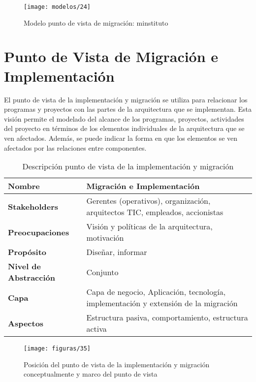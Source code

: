  \begin{figure}[H]
	\centering
	\texttt{[image: modelos/24]}
	\captionsetup{width=.95\textwidth}
	\caption{Modelo punto de vista de migración: minstituto}
	\label{modelo24}
  \end{figure}
  
\section{Punto de Vista de Migración e Implementación}
El punto de vista de la implementación y migración se utiliza para relacionar los programas y proyectos con las partes de la arquitectura que se implementan. Esta visión permite el modelado del alcance de los programas, proyectos, actividades del proyecto en términos de los elementos individuales de la arquitectura que se ven afectados. Además, se puede indicar la forma en que los elementos se ven afectados por las relaciones entre componentes.

  \begin{table}[H]
	\centering
	\begin{tabular}{p{3.7cm}p{8cm}}
		\hline
		\rowcolor[HTML]{0073a1}
		{\color[HTML]{FFFFFF} \textbf{Nombre}} & {\color[HTML]{FFFFFF} \textbf{Migración e Implementación}} \\
		\hline
		\textbf{Stakeholders} & Gerentes (operativos), organización, arquitectos TIC, empleados, accionistas \\
		\textbf{Preocupaciones} &  Visión y políticas de la arquitectura, motivación \\
		\textbf{Propósito} & Diseñar, informar \\
		\textbf{Nivel de Abstracción} & Conjunto \\
		\textbf{Capa} & Capa de negocio, Aplicación, tecnología, implementación y extensión de la migración \\
		\textbf{Aspectos} & Estructura pasiva, comportamiento, estructura activa \\
		\bottomrule
	\end{tabular}
	\captionsetup{width=.95\textwidth}
	\caption{Descripción punto de vista de la implementación y migración}
	\label{tabla28}
  \end{table}

  \begin{figure}[H]
	\centering
	\texttt{[image: figuras/35]}
	\captionsetup{width=.95\textwidth}
	\caption{Posición del punto de vista de la implementación y migración conceptualmente y marco del punto de vista}
	\label{figura37}
  \end{figure}


